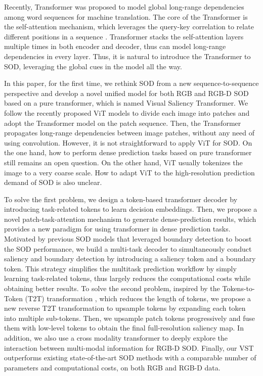 \documentclass[10pt,twocolumn,letterpaper]{article}
\begin{document}
Recently, Transformer \cite{vaswani2017attention} was proposed to model global long-range dependencies among word sequences for machine translation. The core of the Transformer is the self-attention mechanism, which leverages the query-key correlation to relate different positions in a sequence \cite{vaswani2017attention}. Transformer stacks the self-attention layers multiple times in both encoder and decoder, thus can model long-range dependencies in every layer.
Thus, it is natural to introduce the Transformer to SOD, leveraging the global cues in the model all the way.

In this paper, for the first time, we rethink SOD from a new sequence-to-sequence perspective and develop a novel unified model for both RGB and RGB-D SOD based on a pure transformer, which is named Visual Saliency Transformer.
We follow the recently proposed ViT models \cite{dosovitskiy2020image,yuan2021tokens} to divide each image into patches and adopt the Transformer model on the patch sequence. Then, the Transformer
propagates long-range dependencies between image patches, without any need of using convolution.
However, it is not straightforward to apply ViT for SOD. On the one hand, how to perform dense prediction tasks based on pure transformer still remains an open question. On the other hand, ViT usually tokenizes the image to a very coarse scale. How to adapt ViT to the high-resolution prediction demand of SOD is also unclear.

To solve the first problem, we design a token-based transformer decoder by introducing task-related tokens to learn decision embeddings. Then, we propose a novel patch-task-attention mechanism to generate dense-prediction results, which provides a new paradigm for using transformer in dense prediction tasks. Motivated by previous SOD models \cite{zhao2019EGNet,Zhou2020ITSD,zhang2020select,Wei2020CoNet} that leveraged boundary detection to boost the SOD performance, we build a multi-task decoder to simultaneously conduct saliency and boundary detection by introducing a saliency token and a boundary token. This strategy simplifies the multitask prediction workflow by simply learning task-related tokens, thus largely reduces the computational costs while obtaining better results. To solve the second problem, inspired by the Tokens-to-Token (T2T) transformation \cite{yuan2021tokens}, which reduces the length of tokens, we propose a new reverse T2T transformation to upsample tokens by expanding each token into multiple sub-tokens. Then, we upsample patch tokens progressively and fuse them with low-level tokens to obtain the final full-resolution saliency map.
In addition,
we also use a cross modality transformer to deeply explore the interaction between multi-modal information for RGB-D SOD. Finally, our VST outperforms existing state-of-the-art SOD methods with a comparable number of parameters and computational costs, on both RGB and RGB-D data.
\end{document}
